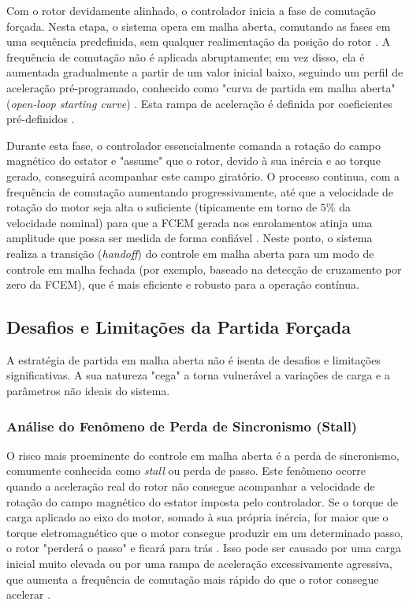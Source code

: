 \documentclass[12pt, a4paper, openright, oneside, brazilian]{abntex2}
\begin{document}
Com o rotor devidamente alinhado, o controlador inicia a fase de comutação forçada. Nesta etapa, o sistema opera em malha aberta, comutando as fases em uma sequência predefinida, sem qualquer realimentação da posição do rotor \cite{nxp2023sensorless}. A frequência de comutação não é aplicada abruptamente; em vez disso, ela é aumentada gradualmente a partir de um valor inicial baixo, seguindo um perfil de aceleração pré-programado, conhecido como "curva de partida em malha aberta" (\textit{open-loop starting curve}) \cite{ti2022minimizing}. Esta rampa de aceleração é definida por coeficientes pré-definidos \cite{ti2022minimizing}.

Durante esta fase, o controlador essencialmente comanda a rotação do campo magnético do estator e "assume" que o rotor, devido à sua inércia e ao torque gerado, conseguirá acompanhar este campo giratório. O processo continua, com a frequência de comutação aumentando progressivamente, até que a velocidade de rotação do motor seja alta o suficiente (tipicamente em torno de $5\%$ da velocidade nominal) para que a FCEM gerada nos enrolamentos atinja uma amplitude que possa ser medida de forma confiável \cite{ti2022minimizing, nxp2023sensorless}. Neste ponto, o sistema realiza a transição (\textit{handoff}) do controle em malha aberta para um modo de controle em malha fechada (por exemplo, baseado na detecção de cruzamento por zero da FCEM), que é mais eficiente e robusto para a operação contínua.

\subsection{Desafios e Limitações da Partida Forçada}

A estratégia de partida em malha aberta não é isenta de desafios e limitações significativas. A sua natureza "cega" a torna vulnerável a variações de carga e a parâmetros não ideais do sistema.

\subsubsection{Análise do Fenômeno de Perda de Sincronismo (Stall)}

O risco mais proeminente do controle em malha aberta é a perda de sincronismo, comumente conhecida como \textit{stall} ou perda de passo. Este fenômeno ocorre quando a aceleração real do rotor não consegue acompanhar a velocidade de rotação do campo magnético do estator imposta pelo controlador. Se o torque de carga aplicado ao eixo do motor, somado à sua própria inércia, for maior que o torque eletromagnético que o motor consegue produzir em um determinado passo, o rotor "perderá o passo" e ficará para trás \cite{nxp2023sensorless}. Isso pode ser causado por uma carga inicial muito elevada ou por uma rampa de aceleração excessivamente agressiva, que aumenta a frequência de comutação mais rápido do que o rotor consegue acelerar \cite{ti2022minimizing}.
\end{document}
